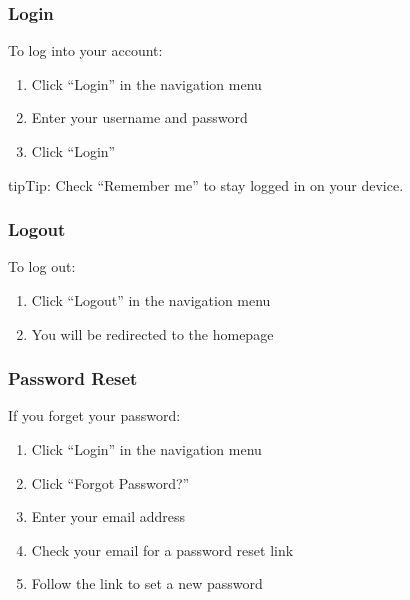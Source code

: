 \documentclass[letterpaper,10pt,english]{sphinxmanual}
\begin{document}
\subsubsection{Login}
\label{\detokenize{user_guide:login}}
\sphinxAtStartPar
To log into your account:
\begin{enumerate}
%
\item {} 
\sphinxAtStartPar
Click “Login” in the navigation menu

\item {} 
\sphinxAtStartPar
Enter your username and password

\item {} 
\sphinxAtStartPar
Click “Login”

\end{enumerate}

\begin{sphinxadmonition}{tip}{Tip:}
\sphinxAtStartPar
Check “Remember me” to stay logged in on your device.
\end{sphinxadmonition}


\subsubsection{Logout}
\label{\detokenize{user_guide:logout}}
\sphinxAtStartPar
To log out:
\begin{enumerate}
%
\item {} 
\sphinxAtStartPar
Click “Logout” in the navigation menu

\item {} 
\sphinxAtStartPar
You will be redirected to the homepage

\end{enumerate}


\subsubsection{Password Reset}
\label{\detokenize{user_guide:password-reset}}
\sphinxAtStartPar
If you forget your password:
\begin{enumerate}
%
\item {} 
\sphinxAtStartPar
Click “Login” in the navigation menu

\item {} 
\sphinxAtStartPar
Click “Forgot Password?”

\item {} 
\sphinxAtStartPar
Enter your email address

\item {} 
\sphinxAtStartPar
Check your email for a password reset link

\item {} 
\sphinxAtStartPar
Follow the link to set a new password

\end{enumerate}
\end{document}
